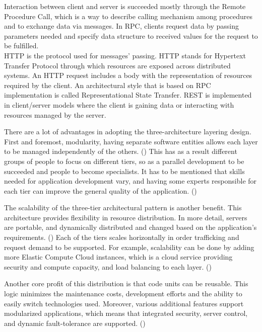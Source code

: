 Interaction between client and server is succeeded mostly through the Remote Procedure Call, which is a way to describe calling mechanism among procedures and to exchange data via messages. In RPC, clients request data by passing parameters needed and specify data structure to received values for the request to be fulfilled. \\
HTTP is the protocol used for messages' passing. HTTP stands for Hypertext Transfer Protocol through which resources are exposed across distributed systems. An HTTP request includes a body with the representation of resources required by the client. An architectural style that is based on RPC implementation is called Representational State Transfer. REST is implemented in client/server models where the client is gaining data or interacting with resources managed by the server. \par

There are a lot of advantages in adopting the three-architecture layering design. First and foremost, modularity, having separate software entities allows each layer to be managed independently of the others. (\cite{Reference2}) This has as a result different groups of people to focus on different tiers, so as a parallel development to be succeeded and people to become specialists. It has to be mentioned that skills needed for application development vary, and having some experts responsible for each tier can improve the general quality of the application. (\cite{Reference5})\par

The scalability of the three-tier architectural pattern is another benefit. This architecture provides flexibility in resource distribution. In more detail, servers are portable, and dynamically distributed and changed based on the application's requirements. (\cite{Reference5})  Each of the tiers scales horizontally in order trafficking and request demand to be supported. For example, scalability can be done by adding more Elastic Compute Cloud instances, which is a cloud service providing security and compute capacity, and load balancing to each layer. (\cite{Reference2}) \par

Another core profit of this distribution is that code units can be reusable. This logic minimizes the maintenance costs, development efforts and the ability to easily switch technologies used. Moreover, various additional features support modularized applications, which means that integrated security, server control, and dynamic fault-tolerance are supported. (\cite{Reference5})\par

